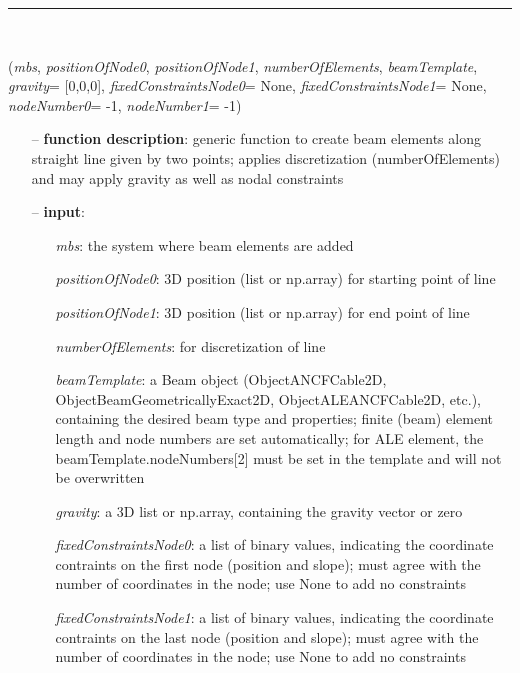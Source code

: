 \begin{itemize}[leftmargin=1.4cm]
\begin{itemize}[leftmargin=1.4cm]
\begin{itemize}[leftmargin=1.4cm]
\begin{itemize}[leftmargin=0.5cm]
\begin{itemize}[leftmargin=1.4cm]
%
\noindent\rule{8cm}{0.75pt}\vspace{1pt} \\ 
\begin{flushleft}
\label{sec:beams:GenerateStraightBeam}
({\it mbs}, {\it positionOfNode0}, {\it positionOfNode1}, {\it numberOfElements}, {\it beamTemplate}, {\it gravity}= [0,0,0], {\it fixedConstraintsNode0}= None, {\it fixedConstraintsNode1}= None, {\it nodeNumber0}= -1, {\it nodeNumber1}= -1)
\end{flushleft}
\setlength{\itemindent}{0.7cm}
\begin{itemize}[leftmargin=0.7cm]
\item[--]
{\bf function description}: generic function to create beam elements along straight line given by two points; applies discretization (numberOfElements) and may apply gravity as well as nodal constraints
\item[--]
{\bf input}: \vspace{-6pt}
\begin{itemize}[leftmargin=1.2cm]
\setlength{\itemindent}{-0.7cm}
\item[]{\it mbs}: the system where beam elements are added
\item[]{\it positionOfNode0}: 3D position (list or np.array) for starting point of line
\item[]{\it positionOfNode1}: 3D position (list or np.array) for end point of line
\item[]{\it numberOfElements}: for discretization of line
\item[]{\it beamTemplate}: a Beam object (ObjectANCFCable2D, ObjectBeamGeometricallyExact2D, ObjectALEANCFCable2D, etc.), containing the desired beam type and properties; finite (beam) element length and node numbers are set automatically; for ALE element, the beamTemplate.nodeNumbers[2] must be set in the template and will not be overwritten
\item[]{\it gravity}: a 3D list or np.array, containing the gravity vector or zero
\item[]{\it fixedConstraintsNode0}: a list of binary values, indicating the coordinate contraints on the first node (position and slope); must agree with the number of coordinates in the node; use None to add no constraints
\item[]{\it fixedConstraintsNode1}: a list of binary values, indicating the coordinate contraints on the last node (position and slope); must agree with the number of coordinates in the node; use None to add no constraints

\end{itemize}
\end{itemize}
\end{itemize}
\end{itemize}
\end{itemize}
\end{itemize}
\end{itemize}
